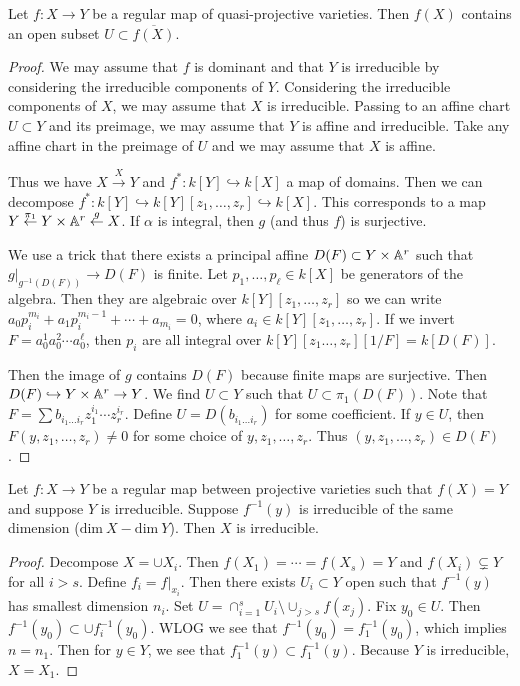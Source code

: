 \documentclass[twoside, 10pt]{article}
\begin{document}
    \begin{thm}
        Let $f: X \to Y$ be a regular map of quasi-projective varieties. Then $f(X)$ contains an open subset $U \subset \overline{f(X)}$.
        \begin{proof}
            We may assume that $f$ is dominant and that $Y$ is irreducible by considering the irreducible components of $Y$. Considering the irreducible components of $X$, we may assume that $X$ is irreducible. Passing to an affine chart $U \subset Y$ and its preimage, we may assume that $Y$ is affine and irreducible. Take any affine chart in the preimage of $U$ and we may assume that $X$ is affine. 
            
            Thus we have $X \overset{X}{\to} Y$ and $f^*: k[Y] \hookrightarrow k[X]$ a map of domains. Then we can decompose $f^*:k[Y] \hookrightarrow k[Y][z_1, \ldots, z_r] \hookrightarrow k[X]$. This corresponds to a map $Y \overset{\pi_1}{\gets} Y \times \mathbb{A}^r \overset{g}{\gets} X$. If $\alpha$ is integral, then $g$ (and thus $f$) is surjective. 
            
            We use a trick that there exists a principal affine $D(F) \subset Y \times \mathbb{A}^r$ such that $g\vert_{g^{-1}(D(F))} \to D(F)$ is finite. Let $p_1, \ldots, p_{\ell} \in k[X]$ be generators of the algebra. Then they are algebraic over $k[Y][z_1, \ldots, z_r]$ so we can write $a_0p_i^{m_i} + a_1p_i^{m_i-1} + \cdots + a_{m_i} = 0$, where $a_i \in k[Y][z_1, \ldots, z_r]$. If we invert $F = a_0^1a_0^2\cdots a_0^{\ell}$, then $p_i$ are all integral over $k[Y][z_1 \ldots, z_r][1/F] = k[D(F)]$.

            Then the image of $g$ contains $D(F)$ because finite maps are surjective. Then $D(F) \hookrightarrow Y \times \mathbb{A}^r \to Y$. We find $U \subset Y$ such that $U \subset \pi_1(D(F))$. Note that $F = \sum b_{i_1 \ldots i_r} z_1^{i_1} \cdots z_r^{i_r}$. Define $U = D(b_{i_1 \ldots i_r})$ for some coefficient. If $y \in U$, then $F(y, z_1, \ldots, z_r) \neq 0$ for some choice of $y, z_1, \ldots, z_r$. Thus $(y, z_1, \ldots, z_r) \in D(F)$.
        \end{proof}
    \end{thm}

    \begin{thm}
        Let $f:X \to Y$ be a regular map between projective varieties such that $f(X) = Y$ and suppose $Y$ is irreducible. Suppose $f^{-1}(y)$ is irreducible of the same dimension ($\mathrm{dim}\ X - \mathrm{dim}\ Y$). Then $X$ is irreducible.
        \begin{proof}
            Decompose $X = \cup X_i$. Then $f(X_1) = \cdots = f(X_s) = Y$ and $f(X_i) \subsetneq Y$ for all $i > s$. Define $f_i = f \vert_{x_i}$. Then there exists $U_i \subset Y$ open such that $f^{-1}(y)$ has smallest dimension $n_i$. Set $U = \cap_{i=1}^s U_i \setminus \cup_{j > s} f(x_j)$. Fix $y_0 \in U$. Then $f^{-1}(y_0) \subset \cup f_i^{-1}(y_0)$. WLOG we see that $f^{-1}(y_0) = f_1^{-1}(y_0)$, which implies $n = n_1$. Then for $y \in Y$, we see that $f_1^{-1}(y) \subset f_1^{-1}(y)$. Because $Y$ is irreducible, $X = X_1$.
        \end{proof}
    \end{thm}
\end{document}
